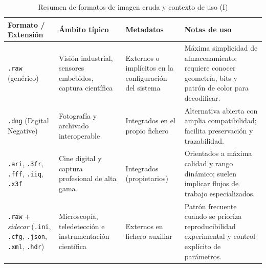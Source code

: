 \begin{table}[htbp]
    \centering
    \footnotesize
    \renewcommand{\arraystretch}{1.15}
    \setlength{\tabcolsep}{4pt}
    \begin{tabularx}{\textwidth}{|>{\hsize=0.95\hsize\raggedright\arraybackslash}X|>{\hsize=1.00\hsize\raggedright\arraybackslash}X|>{\hsize=0.85\hsize\raggedright\arraybackslash}X|>{\hsize=1.20\hsize\raggedright\arraybackslash}X|}
        \hline
        \rowcolor[gray]{0.90}
        \textbf{Formato / Extensión} & \textbf{Ámbito típico} & \textbf{Metadatos} & \textbf{Notas de uso} \\
        \hline
        \texttt{.raw} (genérico) & Visión industrial, sensores embebidos, captura científica & Externos o implícitos en la configuración del sistema & Máxima simplicidad de almacenamiento; requiere conocer geometría, bits y patrón de color para decodificar. \\
        \hline
        \texttt{.dng} (Digital Negative) & Fotografía y archivado interoperable & Integrados en el propio fichero & Alternativa abierta con amplia compatibilidad; facilita preservación y trazabilidad. \\
        \hline
        \texttt{.ari}, \texttt{.3fr}, \texttt{.fff}, \texttt{.iiq}, \texttt{.x3f} & Cine digital y captura profesional de alta gama & Integrados (propietarios) & Orientados a máxima calidad y rango dinámico; suelen implicar flujos de trabajo especializados. \\
        \hline
        \texttt{.raw} + \textit{sidecar} (\texttt{.ini}, \texttt{.cfg}, \texttt{.json}, \texttt{.xml}, \texttt{.hdr}) & Microscopía, teledetección e instrumentación científica & Externos en fichero auxiliar & Patrón frecuente cuando se prioriza reproducibilidad experimental y control explícito de parámetros. \\
        \hline
    \end{tabularx}
    \caption{Resumen de formatos de imagen cruda y contexto de uso (I)}
    \label{tab:appendix_c_raw_formats_common_i}
\end{table}

